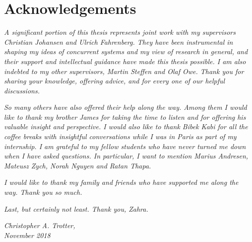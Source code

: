 
\chapter*{Acknowledgements}
\addchaptertocentry{\acknowledgementname} %

\emph{A significant portion of this thesis represents joint work with my supervisors Christian Johansen and Ulrich Fahrenberg. They have been instrumental in shaping my ideas of concurrent systems and my view of research in general, and their support and intellectual guidance have made this thesis possible. I am also indebted to my other supervisors, Martin Steffen and Olaf Owe. Thank you for sharing your knowledge, offering advice, and for every one of our helpful discussions.}

\emph{So many others have also offered their help along the way. Among them I would like to thank my brother James for taking the time to listen and for offering his valuable insight and perspective. I would also like to thank Bibek Kabi for all the coffee breaks with insightful conversations while I was in Paris as part of my internship. I am grateful to my fellow students who have never turned me down when I have asked questions. In particular, I want to mention Marius Andresen, Mateusz Zych, Norah Nguyen and Ratan Thapa.}

\emph{I would like to thank my family and friends who have supported me along the way. Thank you so much.}

\emph{Last, but certainly not least. Thank you, Zahra.}

\null\hfill \emph{Christopher A. Trotter,}\\
\null\hfill \emph{November 2018}